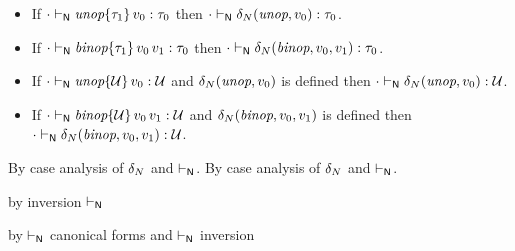 \begin{lemma}\label{H-delta-type-preservation}\leavevmode
  \begin{itemize}
    \item
      If\/ ${\cdot} \vdash_{\mathsf{N}} \textit{unop}{\{\tau_1\}}\,v_0 : \tau_0$
      then\/ ${\cdot} \vdash_{\mathsf{N}} \delta_{N}(\textit{unop}, v_0) : \tau_0$.
    \item
      If\/ ${\cdot} \vdash_{\mathsf{N}} \textit{binop}{\{\tau_1\}}\,v_0\,v_1 : \tau_0$
      then\/ ${\cdot} \vdash_{\mathsf{N}} \delta_{N}(\textit{binop}, v_0, v_1) : \tau_0$.
    \item
      If\/ ${\cdot} \vdash_{\mathsf{N}} \textit{unop}{\{{\mathcal U}\}}\,v_0 : {\mathcal U}$
      and\/ $\delta_{N}(\textit{unop}, v_0)$ is defined
      then\/ ${\cdot} \vdash_{\mathsf{N}} \delta_{N}(\textit{unop}, v_0) : {\mathcal U}$.
    \item
      If\/ ${\cdot} \vdash_{\mathsf{N}} \textit{binop}{\{{\mathcal U}\}}\,v_0\,v_1 : {\mathcal U}$
      and\/ $\delta_{N}(\textit{binop}, v_0, v_1)$ is defined
      then\/ ${\cdot} \vdash_{\mathsf{N}} \delta_{N}(\textit{binop}, v_0, v_1) : {\mathcal U}$.
  \end{itemize}
\end{lemma}{
  \newcommand{\shortpf}{By case analysis of $\sdeltaH$ and $\sWTN$.}
\begin{lamportproof*}
  \shortpf
\mainproof
  \shortpf

    \begin{pfproof}
        \begin{pfproof}
          by inversion $\vdash_{\mathsf{N}}$
        \end{pfproof}
      \qedstep
    \end{pfproof}

    \begin{pfproof}
        \begin{pfproof}
          by $\vdash_{\mathsf{N}}$ canonical forms and $\vdash_{\mathsf{N}}$ inversion
        \end{pfproof}
      \qedstep
    \end{pfproof}


\end{lamportproof*}}
